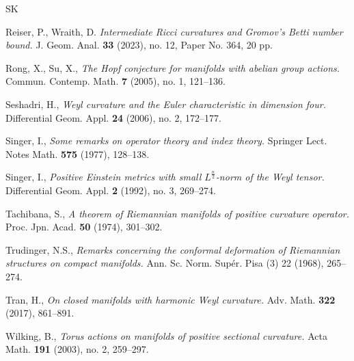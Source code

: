 \documentclass[12pt, twoside]{article}
\theoremstyle{definition}
\numberwithin{equation}{section}
\begin{document}
\begin{thebibliography}{SK}
	
	 Reiser, P.,  Wraith, D.
	 \textit{ Intermediate Ricci curvatures and Gromov's Betti number bound.}
	  J. Geom. Anal. \textbf{33} (2023), no. 12, Paper No. 364, 20 pp.
	
	Rong, X., Su, X.,
	\textit{The Hopf conjecture for manifolds with abelian group actions.} 
	Commun. Contemp. Math. \textbf{7} (2005), no. 1, 121--136.
	
	Seshadri, H.,
	\textit{Weyl curvature and the Euler characteristic in dimension four.}
	 Differential Geom. Appl. \textbf{24} (2006), no. 2, 172--177. 
	
	Singer, I.,
	\textit{Some remarks on operator theory and index theory.} Springer Lect. Notes Math. \textbf{575} (1977), 128--138.
	
	Singer, I., 
	\textit{Positive Einstein metrics with small $L^{\frac{n}{2}}$-norm of the Weyl tensor.} 
	Differential Geom. Appl. \textbf{2} (1992), no. 3, 269--274.
	
	Tachibana, S.,
	\textit{A theorem of Riemannian manifolds of positive curvature operator.} Proc. Jpn. Acad. \textbf{50} (1974), 301--302. 
	
	Trudinger, N.S.,
	\textit{Remarks concerning the conformal deformation of Riemannian structures on compact manifolds.} 
	Ann. Sc. Norm. Sup\'{e}r. Pisa (3) 22 (1968), 265--274. 
	
	Tran, H.,
	\textit{On closed manifolds with harmonic Weyl curvature.}
	Adv. Math. \textbf{322} (2017), 861--891. 
	
	Wilking, B.,
	\textit{Torus actions on manifolds of positive sectional curvature.}
	Acta Math. \textbf{191} (2003), no. 2, 259--297. 
	
	
	
\end{thebibliography}
\end{document}
